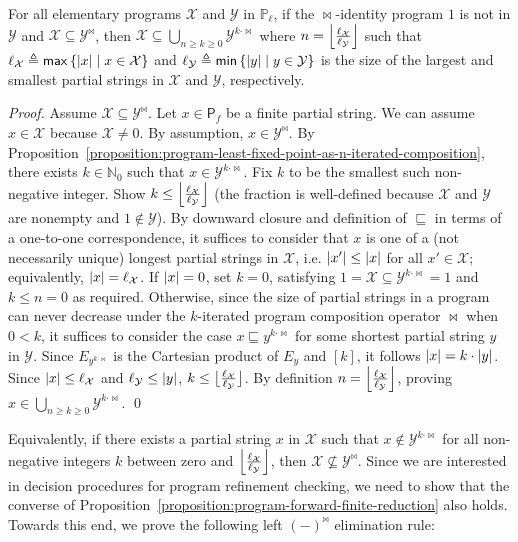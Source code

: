 \documentclass{llncs}
\newcommand{\alt}{\mathrel{|}}
\newcommand{\deq}{\triangleq}
\newcommand{\nats}{\mathbb{N}}
\newcommand{\sP}{\mathsf{P}}
\newcommand{\cX}{\mathcal{X}}
\newcommand{\cY}{\mathcal{Y}}
\newcommand{\bbP}{\mathbb{P}}
\DeclarePairedDelimiter\abs{\lvert}{\rvert}
\DeclarePairedDelimiter{\floor}{\lfloor}{\rfloor}
\begin{document}
\begin{proposition}
\label{proposition:program-forward-finite-reduction}
For all elementary programs $\cX$ and $\cY$ in $\bbP_\ell$, if the $\Join$-identity program $1$ is not in $\cY$ and $\cX \subseteq \cY^{\Join}$, then $\cX \subseteq \bigcup_{n \ge k \ge 0} \cY^{k \cdot \Join}$ where $n = \floor[\Big]{\frac{\ell_\cX}{\ell_\cY}}$ such that $\ell_\cX \deq \mathsf{max}\left\{\abs{x} \alt x \in \cX\right\}$ and $\ell_\cY \deq \mathsf{min}\left\{\abs{y} \alt y \in \cY\right\}$ is the size of the largest and smallest partial strings in $\cX$ and $\cY$, respectively.
\end{proposition}
\begin{proof}
Assume $\cX \subseteq \cY^{\Join}$. Let $x \in \sP_f$ be a finite partial string. We can assume $x \in \cX$ because $\cX \not= 0$. By assumption, $x \in \cY^{\Join}$. By Proposition~\ref{proposition:program-least-fixed-point-as-n-iterated-composition}, there exists $k \in \nats_0$ such that $x \in \cY^{k \cdot \Join}$. Fix $k$ to be the smallest such non-negative integer. Show $k \leq \floor[\Big]{\frac{\ell_\cX}{\ell_\cY}}$ (the fraction is well-defined because $\cX$ and $\cY$ are nonempty and $1 \not\in \cY$). By downward closure and definition of $\sqsubseteq$ in terms of a one-to-one correspondence, it suffices to consider that $x$ is one of a (not necessarily unique) longest partial strings in $\cX$, i.e. $\abs{x'} \leq \abs{x}$ for all $x' \in \cX$; equivalently, $\abs{x} = \ell_\cX$. If $\abs{x} = 0$, set $k = 0$, satisfying $1 = \cX \subseteq \cY^{k \cdot \Join} = 1$ and $k \leq n = 0$ as required. Otherwise, since the size of partial strings in a program can never decrease under the $k$-iterated program composition operator $\Join$ when $0 < k$, it suffices to consider the case $x \sqsubseteq y^{k \cdot \Join}$ for some shortest partial string $y$ in $\cY$. Since $E_{y^{k \cdot \Join}}$ is the Cartesian product of $E_y$ and $[k]$, it follows $\abs{x} = k \cdot \abs{y}$. Since $\abs{x} \leq \ell_\cX$ and $\ell_\cY \leq \abs{y}$, $k \leq \floor[\big]{\frac{\ell_\cX}{\ell_\cY}}$. By definition $n = \floor[\Big]{\frac{\ell_\cX}{\ell_\cY}}$, proving $x \in \bigcup_{n \ge k \ge 0} \cY^{k \cdot \Join}$. \qed
\end{proof}

Equivalently, if there exists a partial string $x$ in $\cX$ such that $x \not\in \cY^{k \cdot \Join}$ for all non-negative integers $k$ between zero and $\floor[\Big]{\frac{\ell_\cX}{\ell_\cY}}$, then $\cX \not\subseteq \cY^{\Join}$. Since we are interested in decision procedures for program refinement checking, we need to show that the converse of Proposition~\ref{proposition:program-forward-finite-reduction} also holds. Towards this end, we prove the following left $(-)^{\Join}$ elimination rule:
\end{document}
